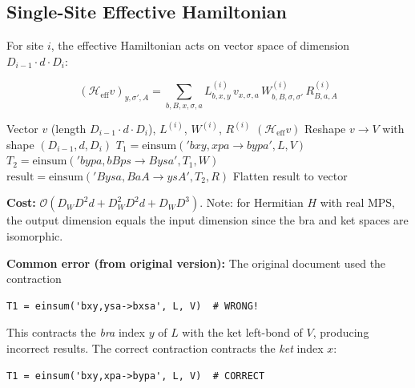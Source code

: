 \documentclass[aps,prb,onecolumn,scriptaddress]{revtex4-2}
\begin{document}
\subsection{Single-Site Effective Hamiltonian}

For site $i$, the effective Hamiltonian acts on vector space of dimension $D_{i-1} \cdot d \cdot D_i$:

\begin{equation}
(\mathcal{H}_{\text{eff}} v)_{y, \sigma', A} = \sum_{b, B, x, \sigma, a}
L^{(i)}_{b, x, y} \,
v_{x, \sigma, a} \,
W^{(i)}_{b, B, \sigma, \sigma'} \,
R^{(i)}_{B, a, A}
\end{equation}

\begin{algorithm}[H]
\caption{ApplyHeff (Single-Site) --- Corrected}
\begin{algorithmic}[1]
	\Require Vector $v$ (length $D_{i-1} \cdot d \cdot D_i$), $L^{(i)}$, $W^{(i)}$, $R^{(i)}$
	\Ensure $(\mathcal{H}_{\text{eff}} v)$
	\State Reshape $v \to V$ with shape $(D_{i-1}, d, D_i)$ 
	\State {}
	\State $T_1 = \text{einsum}('bxy,xpa \to bypa', L, V)$
	\State {}
	\State $T_2 = \text{einsum}('bypa,bBps \to Bysa', T_1, W)$
	\State {}
	\State $\text{result} = \text{einsum}('Bysa,BaA \to ysA', T_2, R)$
	\State \Return Flatten result to vector 
\end{algorithmic}
\end{algorithm}

\textbf{Cost:} $\mathcal{O}(D_W D^2 d + D_W^2 D^2 d + D_W D^3)$. Note: for Hermitian $H$ with real MPS, the output dimension equals the input dimension since the bra and ket spaces are isomorphic.

\textbf{Common error (from original version):} The original document used the contraction
\begin{verbatim}
T1 = einsum('bxy,ysa->bxsa', L, V)  # WRONG!
\end{verbatim}
This contracts the \emph{bra} index $y$ of $L$ with the ket left-bond of $V$, producing incorrect results. The correct contraction contracts the \emph{ket} index $x$:
\begin{verbatim}
T1 = einsum('bxy,xpa->bypa', L, V)  # CORRECT
\end{verbatim}
\end{document}
